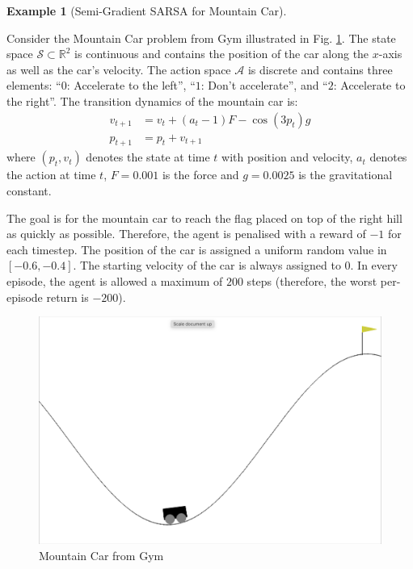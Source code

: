 \documentclass[
]{book}
\theoremstyle{definition}
\theoremstyle{definition}
\newtheorem{example}{Example}[chapter]
\theoremstyle{definition}
\theoremstyle{definition}
\theoremstyle{remark}
\begin{document}
\begin{example}[Semi-Gradient SARSA for Mountain Car]
\protect\hypertarget{exm:MountainCarSemiGradientSARSA}{}\label{exm:MountainCarSemiGradientSARSA}

Consider the Mountain Car problem from Gym illustrated in Fig. \ref{fig:Mountain-car-plot}. The state space \(\mathcal{S} \subset \mathbb{R}^2\) is continuous and contains the position of the car along the \(x\)-axis as well as the car's velocity. The action space \(\mathcal{A}\) is discrete and contains three elements: ``\(0\): Accelerate to the left'', ``\(1\): Don't accelerate'', and ``\(2\): Accelerate to the right''. The transition dynamics of the mountain car is:
\begin{equation}
\begin{split}
v_{t+1} &= v_t + (a_t - 1) F - \cos (3 p_t) g \\
p_{t+1} &= p_t + v_{t+1}
\end{split}
\end{equation}
where \((p_t, v_t)\) denotes the state at time \(t\) with position and velocity, \(a_t\) denotes the action at time \(t\), \(F=0.001\) is the force and \(g = 0.0025\) is the gravitational constant.

The goal is for the mountain car to reach the flag placed on top of the right hill as quickly as possible. Therefore, the agent is penalised with a reward of \(-1\) for each timestep. The position of the car is assigned a uniform random value in \([-0.6 , -0.4]\). The starting velocity of the car is always assigned to 0. In every episode, the agent is allowed a maximum of \(200\) steps (therefore, the worst per-episode return is \(-200\)).

\begin{figure}

{\centering \includegraphics[width=0.5\linewidth]{images/Value-RL/mountain_car} 

}

\caption{Mountain Car from Gym}\label{fig:Mountain-car-plot}
\end{figure}


\end{example}
\end{document}
